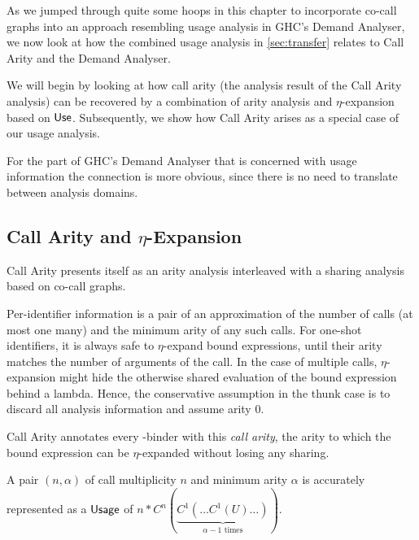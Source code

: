 As we jumped through quite some hoops in this chapter to incorporate co-call graphs into an approach resembling usage analysis in GHC's Demand Analyser, we now look at how the combined usage analysis in \cref{sec:transfer} relates to Call Arity and the Demand Analyser.

We will begin by looking at how call arity (the analysis result of the Call Arity analysis) can be recovered by a combination of arity analysis and $\eta$-expansion based on $\text{\textsf{Use}}$. 
Subsequently, we show how Call Arity arises as a special case of our usage analysis.

For the part of GHC's Demand Analyser that is concerned with usage information \parencite{card} the connection is more obvious, since there is no need to translate between analysis domains.

\subsection{Call Arity and $\eta$-Expansion}

Call Arity \parencite{callarity} presents itself as an arity analysis interleaved with a sharing analysis based on co-call graphs. 

Per-identifier information is a pair of an approximation of the number of calls (\eg at most one \vs many) and the minimum arity of any such calls.
For one-shot identifiers, it is always safe to $\eta$-expand bound expressions, until their arity matches the number of arguments of the call.
In the case of multiple calls, $\eta$-expansion might hide the otherwise shared evaluation of the bound expression behind a lambda.
Hence, the conservative assumption in the thunk case is to discard all analysis information and assume arity 0.

Call Arity annotates every -binder with this \emph{call arity}, the arity to which the bound expression can be $\eta$-expanded without losing any sharing.

A pair $(n, \alpha)$ of call multiplicity $n$ and minimum arity $\alpha$ is accurately represented as a $\text{\textsf{Usage}}$ of $n*C^n(\underbrace{C^1(\ldots C^1(U) \ldots)}_{\alpha-1 \text{~times}})$.

